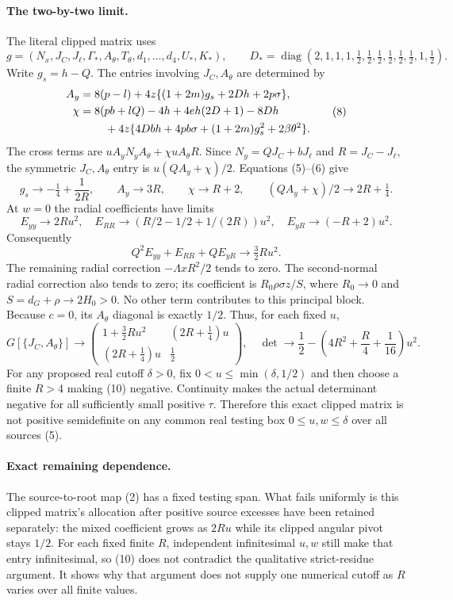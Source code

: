 \documentclass[11pt]{article}
\newcommand{\diag}{\operatorname{diag}}
\begin{document}
\paragraph{The two-by-two limit.}
The literal clipped matrix uses
\[
 g=(N_x,J_C,J_\ell,\Gamma_*,A_\theta,T_\theta,d_1,\ldots,d_4,U_*,K_*),
 \qquad
 D_*=\diag(2,1,1,1,\tfrac12,\tfrac12,
                    \tfrac12,\tfrac12,\tfrac12,\tfrac12,1,\tfrac12).
\]
Write $g_s=h-Q$. The entries involving $J_C,A_\theta$ are determined by
\[
\begin{split}
 A_y&=8(p-l)+4z\{(1+2m)g_s+2Dh+2p\sigma\},\\
 \chi&=8(pb+lQ)-4h+4eh(2D+1)-8Dh\\
 &\hspace{8mm}+4z\{4Dbh+4pb\sigma+(1+2m)g_s^2+2\beta\theta^2\}.
\end{split} \tag{8}
\]
The cross terms are $uA_yN_yA_\theta+\chi uA_\theta R$.
Since $N_y=QJ_C+bJ_\ell$ and $R=J_C-J_\ell$, the symmetric
$J_C,A_\theta$ entry is $u(QA_y+\chi)/2$. Equations (5)--(6) give
\[
 g_s\to-\tfrac14+\frac1{2R},\qquad
 A_y\to3R,\qquad \chi\to R+2,\qquad
 (QA_y+\chi)/2\to2R+\tfrac14. \tag{9}
\]
At $w=0$ the radial coefficients have limits
\[
 E_{yy}\to2Ru^2,\quad
 E_{RR}\to(R/2-1/2+1/(2R))u^2,\quad
 E_{yR}\to(-R+2)u^2.
\]
Consequently
\[
 Q^2E_{yy}+E_{RR}+QE_{yR}\longrightarrow\tfrac32Ru^2.
\]
The remaining radial correction $-\Lambda xR^2/2$ tends to zero.
The second-normal radial correction also tends to zero; its coefficient
is $R_0\rho\sigma z/S$, where
$R_0\to0$ and $S=d_G+\rho\to2H_0>0$.
No other term contributes to this principal block. Because $c=0$,
its $A_\theta$ diagonal is exactly $1/2$. Thus, for each fixed $u$,
\[
 G[\{J_C,A_\theta\}]\longrightarrow
 \begin{pmatrix}
  1+\frac32Ru^2 &(2R+\frac14)u\\
  (2R+\frac14)u&\frac12
 \end{pmatrix},
 \quad
 \det\longrightarrow
 \frac12-\left(4R^2+\frac R4+\frac1{16}\right)u^2.
 \tag{10}
\]
For any proposed real cutoff $\delta>0$, fix
$0<u\le\min(\delta,1/2)$ and then choose a finite $R>4$ making
(10) negative. Continuity makes the actual determinant negative for
all sufficiently small positive $\tau$. Therefore this exact clipped
matrix is not positive semidefinite on any common real testing box
$0\le u,w\le\delta$ over all sources (5).

\paragraph{Exact remaining dependence.}
The source-to-root map (2) has a fixed testing span. What fails
uniformly is this clipped matrix's allocation after positive source
excesses have been retained separately: the mixed coefficient grows
as $2Ru$ while its clipped angular pivot stays $1/2$.
For each fixed finite $R$, independent infinitesimal $u,w$ still make
that entry infinitesimal, so (10) does not contradict the qualitative
strict-residue argument. It shows why that argument does not supply
one numerical cutoff as $R$ varies over all finite values.
\end{document}
